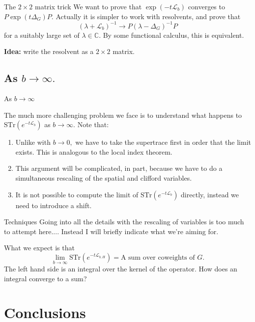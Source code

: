 \documentclass{beamer}
\numberwithin{equation}{section}
\theoremstyle{plain}
\theoremstyle{plain}
\theoremstyle{definition}
\theoremstyle{plain}
\theoremstyle{plain}
\theoremstyle{definition}
\newcommand{\Cplx}{\mathbb{C}}
\newcommand{\Lc}{\mathcal{L}}
\newcommand{\Str}{\mathrm{STr}}
\begin{document}
\begin{frame}{The $2\times 2$ matrix trick}
  We want to prove that $\exp(-t\Lc_b)$ converges to $P\exp(t\Delta_G)P.$ Actually it is simpler to work with resolvents, and prove that
  \[
    (\lambda+\Lc_b)^{-1} \rightarrow P(\lambda-\Delta_G)^{-1}P
  \]
  for a suitably large set of $\lambda\in \Cplx.$ By some functional calculus, this is equivalent. 
  
  \textbf{Idea:} write the resolvent as a $2\times 2$ matrix.
\end{frame}

\subsection{As $b\to \infty.$}

\begin{frame}
  \huge{As $b\to\infty$}
\end{frame}

\begin{frame}
  The much more challenging problem we face is to understand what happens to $\Str(e^{-t\Lc_b})$ as $b\to\infty.$
  Note that:
  \begin{enumerate}
    \item{} Unlike with $b\to 0,$ we have to take the supertrace first in order that the limit exists. This is analogous to the local index theorem. 
    \item{} This argument will be complicated, in part, because we have to do a simultaneous rescaling of the spatial and clifford variables.
    \item{} It is not possible to compute the limit of $\Str(e^{-t\Lc_b})$ directly, instead we need to introduce a shift.
  \end{enumerate}
\end{frame}

\begin{frame}{Techniques}
  Going into all the details with the rescaling of variables is too much to attempt here.... Instead I will briefly indicate what we're aiming for.
  
  What we expect is that
  \[
    \lim_{b\to\infty}\Str(e^{-t\Lc_{b,H}}) = \text{A sum over coweights of }G.
  \]
  The left hand side is an integral over the kernel of the operator. How does an integral converge to a sum?
  
\end{frame}

\section{Conclusions}
\end{document}
